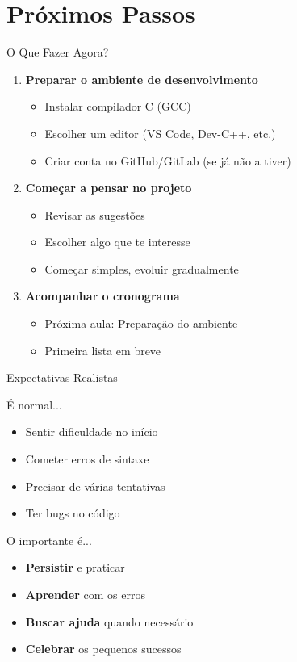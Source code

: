 \documentclass[10pt]{beamer}
\begin{document}
\section{Próximos Passos}

\begin{frame}{O Que Fazer Agora?}
	\begin{enumerate}
		\item \textbf{Preparar o ambiente de desenvolvimento}
		\begin{itemize}
			\item Instalar compilador C (GCC)
			\item Escolher um editor (VS Code, Dev-C++, etc.)
			\item Criar conta no GitHub/GitLab (se já não a tiver)
		\end{itemize}
		
		\item \textbf{Começar a pensar no projeto}
		\begin{itemize}
			\item Revisar as sugestões
			\item Escolher algo que te interesse
			\item Começar simples, evoluir gradualmente
		\end{itemize}
		
		\item \textbf{Acompanhar o cronograma}
		\begin{itemize}
			\item Próxima aula: Preparação do ambiente
			\item Primeira lista em breve
		\end{itemize}
	\end{enumerate}
\end{frame}

\begin{frame}{Expectativas Realistas}
	\begin{alertblock}{É normal...}
		\begin{itemize}
			\item Sentir dificuldade no início
			\item Cometer erros de sintaxe
			\item Precisar de várias tentativas
			\item Ter bugs no código
		\end{itemize}
	\end{alertblock}
	
	\begin{block}{O importante é...}
		\begin{itemize}
			\item \textbf{Persistir} e praticar
			\item \textbf{Aprender} com os erros
			\item \textbf{Buscar ajuda} quando necessário
			\item \textbf{Celebrar} os pequenos sucessos
		\end{itemize}
	\end{block}
\end{frame}
\end{document}
